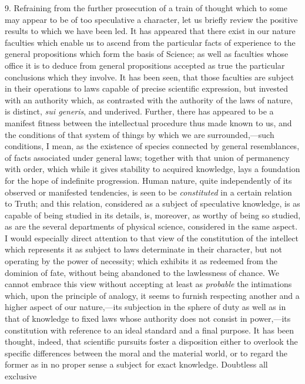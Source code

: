\documentclass[oneside]{book}
\begin{document}
9. Refraining from the further prosecution of a train of thought
which to some may appear to be of too speculative a character,
let us briefly review the positive results to which we have been led.
It has appeared that there exist in our nature faculties which
enable us to ascend from the particular facts of experience to the
general propositions which form the basis of Science; as well as
faculties whose office it is to deduce from general propositions
accepted as true the particular conclusions which they involve.
It has been seen, that those faculties are subject in their operations
to laws capable of precise scientific expression, but invested
with an authority which, as contrasted with the authority of the
laws of nature, is distinct, \textit{sui generis}, and underived. Further,
there has appeared to be a manifest fitness between the intellectual
procedure thus made known to us, and the conditions of
that system of things by which we are surrounded,---such conditions,
I mean, as the existence of species connected by general
resemblances, of facts associated under general laws; together
with that union of permanency with order, which while it gives
stability to acquired knowledge, lays a foundation for the hope
of indefinite progression. Human nature, quite independently
of its observed or manifested tendencies, is seen to be \emph{constituted}
in a certain relation to Truth; and this relation, considered as a
subject of speculative knowledge, is as capable of being studied
in its details, is, moreover, as worthy of being so studied, as are
the several departments of physical science, considered in the same
aspect. I would especially direct attention to that view of the
constitution of the intellect which represents it as subject to laws
determinate in their character, but not operating by the power of
necessity; which exhibits it as redeemed from the dominion of
fate, without being abandoned to the lawlessness of chance. We
cannot embrace this view without accepting at least as \emph{probable}
the intimations which, upon the principle of analogy, it seems to
furnish respecting another and a higher aspect of our nature,---its
subjection in the sphere of duty as well as in that of knowledge to
fixed laws whose authority does not consist in power,---its constitution with reference to an ideal standard and a final purpose.
It has been thought, indeed, that scientific pursuits foster a disposition either to overlook the specific differences between the
moral and the material world, or to regard the former as in no proper sense a subject for exact knowledge. Doubtless all exclusive
\end{document}
